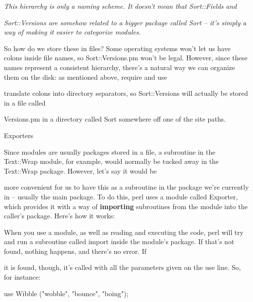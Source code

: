 \documentclass[a4paper,11pt]{book}
\begin{document}
\noindent 

\noindent 

\noindent \textit{This hierarchy is only a naming scheme. It doesn't mean that Sort::Fields and}

\noindent \textit{Sort::Versions are somehow related to a bigger package called Sort -- it's simply a way of making it easier to categorize modules.}

\noindent 

\noindent So how do we store these in files? Some operating systems won't let us have colons inside file names, so Sort::Versions.pm won't be legal. However, since these names represent a consistent hierarchy, there's a natural way we can organize them on the disk: as mentioned above, require and use

\noindent translate colons into directory separators, so Sort::Versions will actually be stored in a file called

\noindent Versions.pm in a directory called Sort somewhere off one of the site paths.

\noindent 

\noindent 

\noindent Exporters

\noindent 

\noindent Since modules are usually packages stored in a file, a subroutine in the Text::Wrap module, for example, would normally be tucked away in the Text::Wrap package. However, let's say it would be

\noindent more convenient for us to have this as a subroutine in the package we're currently in -- usually the main package. To do this, perl uses a module called Exporter, which provides it with a way of \textbf{importing }subroutines from the module into the caller's package. Here's how it works:

\noindent 

\noindent When you use a module, as well as reading and executing the code, perl will try and run a subroutine called import inside the module's package. If that's not found, nothing happens, and there's no error. If

\noindent it is found, though, it's called with all the parameters given on the use line. So, for instance:

\noindent 

\noindent 

\noindent use Wibble ("wobble", "bounce", "boing");

\noindent 
\end{document}
